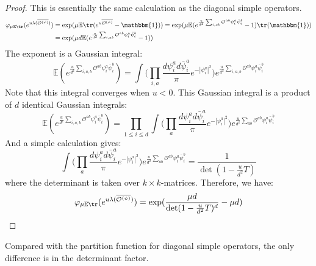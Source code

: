 \documentclass[a4paper,11pt]{article}
\theoremstyle{definition}
\numberwithin{equation}{section}
\begin{document}
\begin{proof}
    This is essentially the same calculation as the diagonal simple operators.
    \begin{align}
        \begin{split}
            \varphi_{\mu\mathbb{E}\tr}(e^{u\lambda(\overline{\mathcal{O}^{(\psi)}})}) &= \exp(\mu\mathbb{E}\tr(e^{u\overline{\mathcal{O}^{(\psi)}}} - \mathbbm{1})) = \exp(\mu\mathbb{E}(e^{\frac{u}{d^2}\sum_{i,ab}\mathcal{O}^{ab}\psi^a_i\bar{\psi}^b_i} - 1)\tr(\mathbbm{1}))
            \\
            &=\exp(\mu d\mathbb{E}(e^{\frac{u}{d^2}\sum_{i,ab}\mathcal{O}^{ab}\psi^a_i\bar{\psi}^b_i} - 1))
        \end{split}
    \end{align}
    The exponent is a Gaussian integral:
    \begin{equation}
        \mathbb{E}(e^{\frac{u}{d^2}\sum_{i,a,b}\mathcal{O}^{ab}\psi^a_i\overline{\psi}^b_i}) = \int \bigg(\prod_{i,a}\frac{d\psi^a_i d\bar{\psi}^a_i}{\pi}e^{-|\psi^a_i|^2}\bigg)e^{\frac{u}{d^2}\sum_{i,a,b}\mathcal{O}^{ab}\psi^a_i\bar{\psi}^b_i}
    \end{equation}
    Note that this integral converges when $u < 0$. This Gaussian integral is a product of $d$ identical Gaussian integrals:
    \begin{equation}
        \mathbb{E}(e^{\frac{u}{d^2}\sum_{i,a,b}\mathcal{O}^{ab}\psi^a_i\bar{\psi}^b_i}) = \prod_{1\leq i\leq d}\int\bigg(\prod_a\frac{d\psi^a_i d\bar{\psi}^a_i}{\pi}e^{-|\psi^a_i|^2}\bigg)e^{\frac{u}{d^2}\sum_{ab}\mathcal{O}^{ab}\psi^a_i\bar{\psi}^b_i}
    \end{equation}
    And a simple calculation gives:
    \begin{equation}
        \int\bigg(\prod_a\frac{d\psi^a_i d\bar{\psi}^a_i}{\pi}e^{-|\psi^a_i|^2}\bigg)e^{\frac{u}{d^2}\sum_{ab}\mathcal{O}^{ab}\psi^a_i\bar{\psi}^b_i} = \frac{1}{\det(1 - \frac{u}{d^2}T)}
    \end{equation}
    where the determinant is taken over $k\times k$-matrices. Therefore, we have:
    \begin{equation}
        \varphi_{\mu\mathbb{E}\tr}(e^{u\lambda(\overline{\mathcal{O}^{(\psi)}})}) = \exp(\frac{\mu d}{\det(1 - \frac{u}{d^2}T)^d} - \mu d)\qedhere
    \end{equation}
\end{proof}
Compared with the partition function for diagonal simple operators, the only difference is in the determinant factor. 
\end{document}
